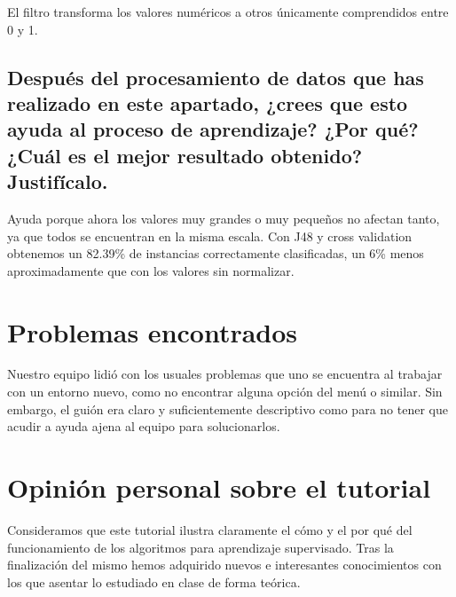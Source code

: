 \documentclass[12pt]{article}
\begin{document}
El filtro transforma los valores numéricos a otros únicamente comprendidos entre 0 y 1.

\subsection*{\small Después del procesamiento de datos que has realizado en este apartado, ¿crees que esto ayuda al proceso de aprendizaje? ¿Por qué? ¿Cuál es el mejor resultado obtenido? Justifícalo.}

Ayuda porque ahora los valores muy grandes o muy pequeños no afectan tanto, ya que todos se encuentran en la misma escala. Con J48 y cross validation obtenemos un 82.39\% de instancias correctamente clasificadas, un 6\% menos aproximadamente que con los valores sin normalizar. 

\section{Problemas encontrados}

Nuestro equipo lidió con los usuales problemas que uno se encuentra al trabajar con un entorno nuevo, como no encontrar alguna opción del menú o similar. Sin embargo, el guión era claro y suficientemente descriptivo como para no tener que acudir a ayuda ajena al equipo para solucionarlos.

\section{Opinión personal sobre el tutorial}

Consideramos que este tutorial ilustra claramente el cómo y el por qué del funcionamiento de los algoritmos para aprendizaje supervisado. Tras la finalización del mismo hemos adquirido nuevos e interesantes conocimientos con los que asentar lo estudiado en clase de forma teórica.
\end{document}
